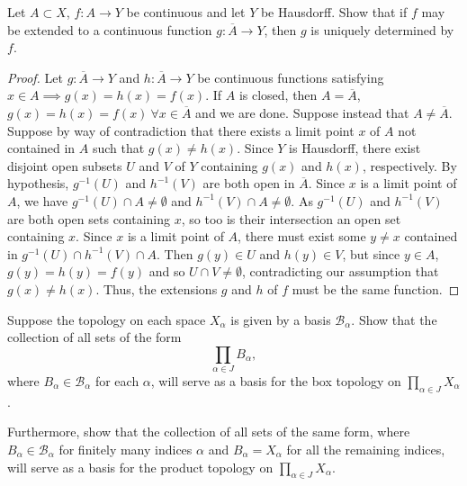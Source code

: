 \documentclass[a4paper,10pt]{article}
\begin{document}
\begin{exercise}[ID=2.18.13]
    Let $A \subset X$, $f: A \rightarrow Y$ be continuous and let $Y$ be Hausdorff.
    Show that if $f$ may be extended to a continuous function $g: \overline{A} \rightarrow Y$, then $g$ is uniquely determined by $f$.
\end{exercise}

\begin{solution}
    \begin{proof}
        Let $g: \overline{A} \rightarrow Y$ and $h: \overline{A} \rightarrow Y$ be continuous functions satisfying $x \in A \implies g(x) = h(x) = f(x)$.
        If $A$ is closed, then $A = \overline{A}$, $g(x) = h(x) = f(x)~ \forall x \in \overline{A}$ and we are done.
        Suppose instead that $A \neq \overline{A}$.
        Suppose by way of contradiction that there exists a limit point $x$ of $A$ not contained in $A$ such that $g(x) \neq h(x)$.
        Since $Y$ is Hausdorff, there exist disjoint open subsets $U$ and $V$ of $Y$ containing $g(x)$ and $h(x)$, respectively.
        By hypothesis, $g^{-1}(U)$ and $h^{-1}(V)$ are both open in $\overline{A}$.
        Since $x$ is a limit point of $A$, we have $g^{-1}(U) \cap A \neq \emptyset$ and $h^{-1}(V) \cap A \neq \emptyset$.
        As $g^{-1}(U)$ and $h^{-1}(V)$ are both open sets containing $x$, so too is their intersection an open set containing $x$.
        Since $x$ is a limit point of $A$, there must exist some $y \neq x$ contained in $g^{-1}(U) \cap h^{-1}(V) \cap A$.
        Then $g(y) \in U$ and $h(y) \in V$, but since $y \in A$, $g(y) = h(y) = f(y)$ and so $U \cap V \neq \emptyset$, contradicting our assumption that $g(x) \neq h(x)$.
        Thus, the extensions $g$ and $h$ of $f$ must be the same function.
    \end{proof}
\end{solution}
\newpage

\begin{exercise}[ID=2.19.1]
    Suppose the topology on each space $X_\alpha$ is given by a basis $\mathscr{B}_\alpha$.
    Show that the collection of all sets of the form
    $$\prod_{\alpha \in J} B_\alpha,$$
    where $B_\alpha \in \mathscr{B}_\alpha$ for each $\alpha$, will serve as a basis for the box topology on $\prod_{\alpha \in J} X_\alpha$.

    Furthermore, show that the collection of all sets of the same form, where $B_\alpha \in \mathscr{B}_\alpha$ for finitely many indices $\alpha$ and $B_\alpha = X_\alpha$ for all the remaining indices, will serve as a basis for the product topology on $\prod_{\alpha \in J} X_\alpha$.
\end{exercise}
\end{document}
